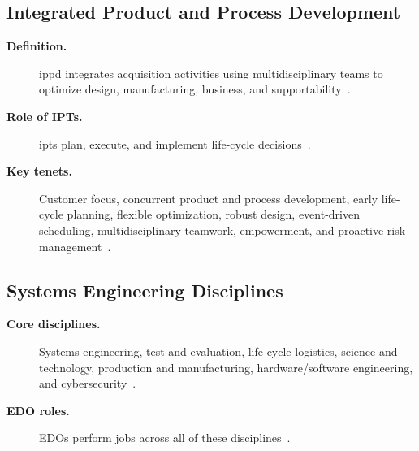 \documentclass[../main.tex]{subfiles}
\begin{document}
\subsection{Integrated Product and Process Development}
\begin{description}
  \item[\textbf{Definition.}] \ac{ippd} integrates acquisition activities using multidisciplinary teams to optimize design, manufacturing, business, and supportability~\autocite{edo-3-5-1-systems-engineering-overview-2025}.
  \item[\textbf{Role of IPTs.}] \acp{ipt} plan, execute, and implement life-cycle decisions~\autocite{edo-3-5-1-systems-engineering-overview-2025}.
  \item[\textbf{Key tenets.}] Customer focus, concurrent product and process development, early life-cycle planning, flexible optimization, robust design, event-driven scheduling, multidisciplinary teamwork, empowerment, and proactive risk management~\autocite{edo-3-5-1-systems-engineering-overview-2025}.
\end{description}

\subsection{Systems Engineering Disciplines}
\begin{description}
  \item[\textbf{Core disciplines.}] Systems engineering, test and evaluation, life-cycle logistics, science and technology, production and manufacturing, hardware/software engineering, and cybersecurity~\autocite{edo-3-5-1-systems-engineering-overview-2025}.
  \item[\textbf{EDO roles.}] EDOs perform jobs across all of these disciplines~\autocite{edo-3-5-1-systems-engineering-overview-2025}.
\end{description}
\end{document}
